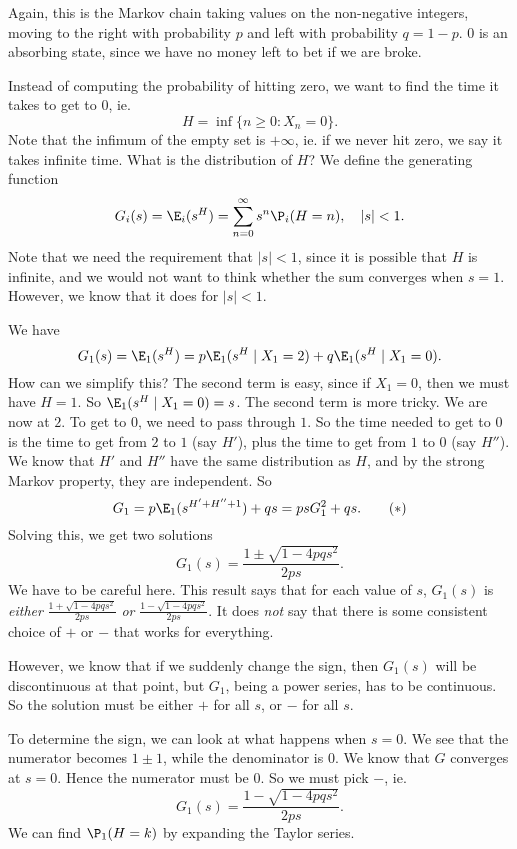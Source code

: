 \documentclass[a4paper]{article}
\begin{document}
\begin{eg}
  Again, this is the Markov chain taking values on the non-negative integers, moving to the right with probability $p$ and left with probability $q = 1 - p$. $0$ is an absorbing state, since we have no money left to bet if we are broke.

  Instead of computing the probability of hitting zero, we want to find the time it takes to get to $0$, ie.
  \[
    H = \inf\{n \geq 0: X_n = 0\}.
  \]
  Note that the infimum of the empty set is $+\infty$, ie. if we never hit zero, we say it takes infinite time. What is the distribution of $H$? We define the generating function
  \[
    G_i(s) = \E_i(s^H) = \sum_{n = 0}^\infty s^n \P_i(H = n),\quad |s| < 1.
  \]
  Note that we need the requirement that $|s| < 1$, since it is possible that $H$ is infinite, and we would not want to think whether the sum converges when $s = 1$. However, we know that it does for $|s| < 1$.

  We have
  \[
    G_1(s) = \E_1(s^H) = p\E_1(s^H\mid X_1 = 2) + q\E_1(s^H\mid X_1 = 0).
  \]
  How can we simplify this? The second term is easy, since if $X_1 = 0$, then we must have $H = 1$. So $\E_1(s^H\mid X_1 = 0) = s$. The second term is more tricky. We are now at $2$. To get to $0$, we need to pass through $1$. So the time needed to get to $0$ is the time to get from $2$ to $1$ (say $H'$), plus the time to get from $1$ to $0$ (say $H''$). We know that $H'$ and $H''$ have the same distribution as $H$, and by the strong Markov property, they are independent. So
  \[
    G_1 = p\E_1(s^{H' + H'' + 1}) + qs = psG_1^2 + qs.\tag{$*$}
  \]
  Solving this, we get two solutions
  \[
    G_1 (s) = \frac{1 \pm \sqrt{1 - 4pqs^2}}{2ps}.
  \]
  We have to be careful here. This result says that for each value of $s$, $G_1(s)$ is \emph{either} $\frac{1 + \sqrt{1 - 4pqs^2}}{2ps}$ \emph{or} $\frac{1 - \sqrt{1 - 4pqs^2}}{2ps}$. It does \emph{not} say that there is some consistent choice of $+$ or $-$ that works for everything.

  However, we know that if we suddenly change the sign, then $G_1(s)$ will be discontinuous at that point, but $G_1$, being a power series, has to be continuous. So the solution must be either $+$ for all $s$, or $-$ for all $s$.

  To determine the sign, we can look at what happens when $s = 0$. We see that the numerator becomes $1 \pm 1$, while the denominator is $0$. We know that $G$ converges at $s = 0$. Hence the numerator must be $0$. So we must pick $-$, ie.
  \[
    G_1 (s) = \frac{1 - \sqrt{1 - 4pqs^2}}{2ps}.
  \]
  We can find $\P_1(H = k)$ by expanding the Taylor series.


\end{eg}
\end{document}
